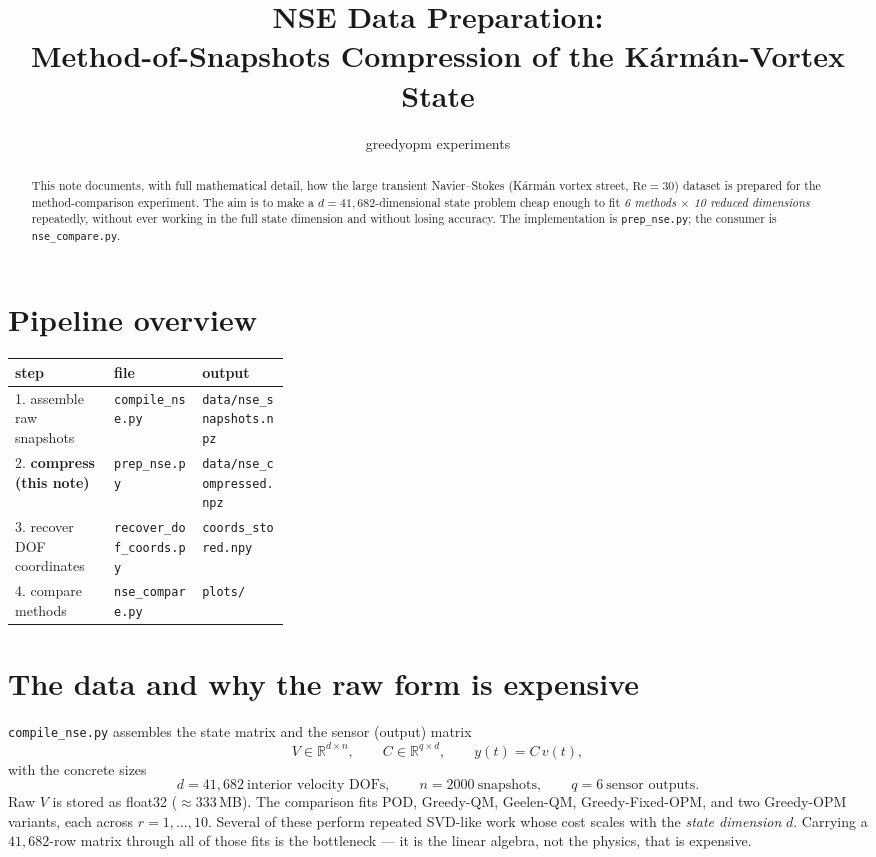 \documentclass[11pt]{article}
\title{\bfseries NSE Data Preparation:\\[2pt]
\large Method-of-Snapshots Compression of the K\'arm\'an-Vortex State}
\author{greedyopm experiments}
\date{}
\newcommand{\R}{\mathbb{R}}
\newcommand{\code}[1]{\texttt{#1}}
\begin{document}
\maketitle

\begin{abstract}
This note documents, with full mathematical detail, how the large transient
Navier--Stokes (K\'arm\'an vortex street, $\mathrm{Re}=30$) dataset is prepared
for the method-comparison experiment. The aim is to make a $d=41{,}682$-dimensional
state problem cheap enough to fit \emph{6 methods $\times$ 10 reduced dimensions}
repeatedly, without ever working in the full state dimension and without losing
accuracy. The implementation is \code{prep\_nse.py}; the consumer is
\code{nse\_compare.py}.
\end{abstract}

\section{Pipeline overview}
\begin{center}
\begin{tabular}{@{}llp{0.32\linewidth}@{}}
\toprule
step & file & output \\
\midrule
1. assemble raw snapshots & \code{compile\_nse.py} & \code{data/nse\_snapshots.npz} \\
2. \textbf{compress (this note)} & \code{prep\_nse.py} & \code{data/nse\_compressed.npz} \\
3. recover DOF coordinates & \code{recover\_dof\_coords.py} & \code{coords\_stored.npy} \\
4. compare methods & \code{nse\_compare.py} & \code{plots/} \\
\bottomrule
\end{tabular}
\end{center}

\section{The data and why the raw form is expensive}
\code{compile\_nse.py} assembles the state matrix and the sensor (output) matrix
\begin{equation}
V \in \R^{d\times n},\qquad C \in \R^{q\times d},\qquad y(t)=C\,v(t),
\end{equation}
with the concrete sizes
\begin{equation}
d = 41{,}682\ \text{interior velocity DOFs},\qquad
n = 2000\ \text{snapshots},\qquad
q = 6\ \text{sensor outputs}.
\end{equation}
Raw $V$ is stored as float32 ($\approx 333$\,MB). The comparison fits POD,
Greedy-QM, Geelen-QM, Greedy-Fixed-OPM, and two Greedy-OPM variants, each across
$r=1,\dots,10$. Several of these perform repeated SVD-like work whose cost scales
with the \emph{state dimension} $d$. Carrying a $41{,}682$-row matrix through all
of those fits is the bottleneck --- it is the linear algebra, not the physics,
that is expensive.
\end{document}
